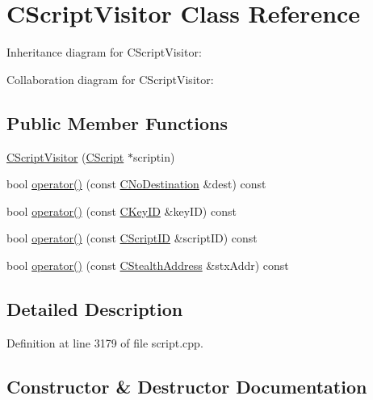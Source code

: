 \hypertarget{class_c_script_visitor}{}\section{C\+Script\+Visitor Class Reference}
\label{class_c_script_visitor}


Inheritance diagram for C\+Script\+Visitor\+:


Collaboration diagram for C\+Script\+Visitor\+:
\subsection*{Public Member Functions}
\begin{DoxyCompactItemize}
\item 
\hyperlink{class_c_script_visitor_acfe7eb4f2ddca134614bf7583e73b3da}{C\+Script\+Visitor} (\hyperlink{class_c_script}{C\+Script} $\ast$scriptin)
\item 
bool \hyperlink{class_c_script_visitor_a1afc8621b36e777fe8946653de3c68cb}{operator()} (const \hyperlink{class_c_no_destination}{C\+No\+Destination} \&dest) const 
\item 
bool \hyperlink{class_c_script_visitor_a15652105241c6f980475a6a5f6029e83}{operator()} (const \hyperlink{class_c_key_i_d}{C\+Key\+I\+D} \&key\+I\+D) const 
\item 
bool \hyperlink{class_c_script_visitor_ad1432cb27a3f34f778423cb803f989ea}{operator()} (const \hyperlink{class_c_script_i_d}{C\+Script\+I\+D} \&script\+I\+D) const 
\item 
bool \hyperlink{class_c_script_visitor_a76c756a23fbf7f0a0be975b78d16cb38}{operator()} (const \hyperlink{class_c_stealth_address}{C\+Stealth\+Address} \&stx\+Addr) const 
\end{DoxyCompactItemize}


\subsection{Detailed Description}


Definition at line 3179 of file script.\+cpp.



\subsection{Constructor \& Destructor Documentation}
\hypertarget{class_c_script_visitor_acfe7eb4f2ddca134614bf7583e73b3da}{}
